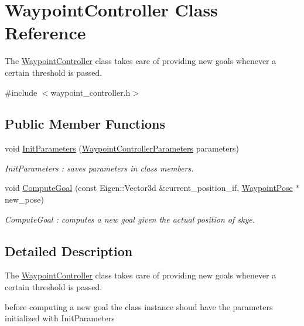 \hypertarget{class_waypoint_controller}{\section{Waypoint\-Controller Class Reference}
\label{class_waypoint_controller}
}


The \hyperlink{class_waypoint_controller}{Waypoint\-Controller} class takes care of providing new goals whenever a certain threshold is passed.  




{\ttfamily \#include $<$waypoint\-\_\-controller.\-h$>$}

\subsection*{Public Member Functions}
\begin{DoxyCompactItemize}
\item 
void \hyperlink{class_waypoint_controller_a10f00d385c12c6ee03b3459d1fe552c1}{Init\-Parameters} (\hyperlink{struct_waypoint_controller_parameters}{Waypoint\-Controller\-Parameters} parameters)
\begin{DoxyCompactList}\small\item\em Init\-Parameters \-: saves parameters in class members. \end{DoxyCompactList}\item 
void \hyperlink{class_waypoint_controller_a99af680a2e0b31de954e96c4df44d26e}{Compute\-Goal} (const Eigen\-::\-Vector3d \&current\-\_\-position\-\_\-if, \hyperlink{struct_waypoint_pose}{Waypoint\-Pose} $\ast$new\-\_\-pose)
\begin{DoxyCompactList}\small\item\em Compute\-Goal \-: computes a new goal given the actual position of skye. \end{DoxyCompactList}\end{DoxyCompactItemize}


\subsection{Detailed Description}
The \hyperlink{class_waypoint_controller}{Waypoint\-Controller} class takes care of providing new goals whenever a certain threshold is passed. 

before computing a new goal the class instance shoud have the parameters initialized with Init\-Parameters 

